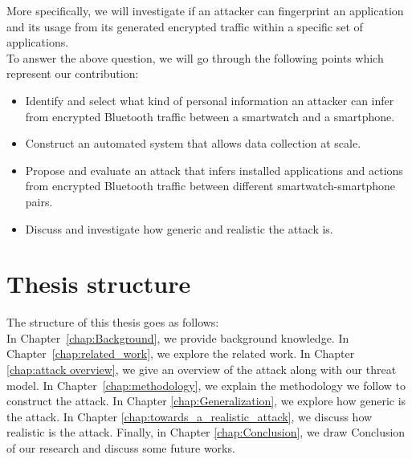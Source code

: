More specifically, we will investigate if an attacker can fingerprint an application and its usage from its generated encrypted traffic within a specific set of applications.  \\

To answer the above question, we will go through the following points which represent our contribution:

\begin{itemize}
	\item Identify and select what kind of personal information an attacker can infer from encrypted Bluetooth traffic between a smartwatch and a smartphone.
	\item Construct an automated system that allows data collection at scale.
	\item Propose and evaluate an attack that infers installed applications and actions from encrypted Bluetooth traffic between different smartwatch-smartphone pairs.
	\item Discuss and investigate how generic and realistic the attack is.
\end{itemize}




\section{Thesis structure}
The structure of this thesis goes as follows: \\

In Chapter~\ref{chap:Background}, we provide background knowledge. In Chapter~\ref{chap:related_work}, we explore the related work. In Chapter \ref{chap:attack overview}, we give an overview of the attack along with our threat model. In Chapter~\ref{chap:methodology}, we explain the methodology we follow to construct the attack. In Chapter \ref{chap:Generalization}, we explore how generic is the attack. In Chapter \ref{chap:towards_a_realistic_attack}, we discuss how realistic is the attack. Finally, in Chapter \ref{chap:Conclusion}, we draw Conclusion of our research and discuss some future works.